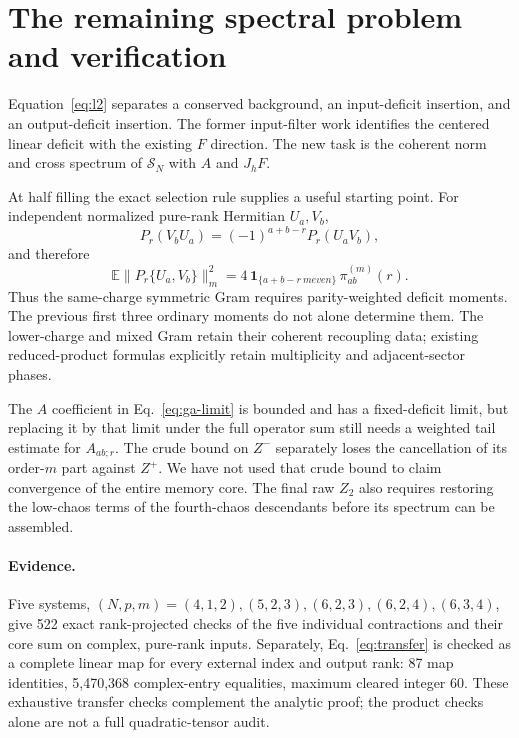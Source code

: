 \documentclass[11pt,a4paper]{article}
\newcommand{\EE}{\mathbb E}
\begin{document}
\newpage
\section{The remaining spectral problem and verification}
Equation~\eqref{eq:l2} separates a conserved background, an
input-deficit insertion, and an output-deficit insertion. The former
input-filter work identifies the centered linear deficit with the
existing $F$ direction. The new task is the coherent norm and cross
spectrum of $\mathcal S_N$ with $A$ and $J_hF$.

At half filling the exact selection rule supplies a useful starting
point. For independent normalized pure-rank Hermitian $U_a,V_b$,
\begin{equation}
 P_r(V_bU_a)=(-1)^{a+b-r}P_r(U_aV_b),
\end{equation}
and therefore
\begin{equation}
 \EE\|P_r\{U_a,V_b\}\|_m^2
   =4\,\mathbf1_{\{a+b-r\ {
m even}\}}\,
                       \pi_{ab}^{(m)}(r).
\end{equation}
Thus the same-charge symmetric Gram requires parity-weighted
deficit moments. The previous first three ordinary moments do not
alone determine them. The lower-charge and mixed Gram retain their
coherent recoupling data; existing reduced-product formulas
\cite{KV} explicitly retain multiplicity and adjacent-sector phases.

The $A$ coefficient in Eq.~\eqref{eq:ga-limit} is bounded and has a
fixed-deficit limit, but replacing it by that limit under the full
operator sum still needs a weighted tail estimate for $A_{ab;r}$.
The crude bound on $Z^-$ separately loses the cancellation of its
order-$m$ part against $Z^+$. We have not used that crude bound to
claim convergence of the entire memory core. The final raw $Z_2$
also requires restoring the low-chaos terms of the fourth-chaos
descendants before its spectrum can be assembled.

\paragraph{Evidence.}
Five systems, $(N,p,m)=(4,1,2),(5,2,3),(6,2,3),(6,2,4),(6,3,4)$,
give 522 exact rank-projected checks of the five individual
contractions and their core sum on complex, pure-rank inputs.
Separately, Eq.~\eqref{eq:transfer} is checked as a complete linear
map for every external index and output rank: 87 map identities,
5,470,368 complex-entry equalities, maximum cleared integer 60.
These exhaustive transfer checks complement the analytic proof;
the product checks alone are not a full quadratic-tensor audit.
\end{document}
